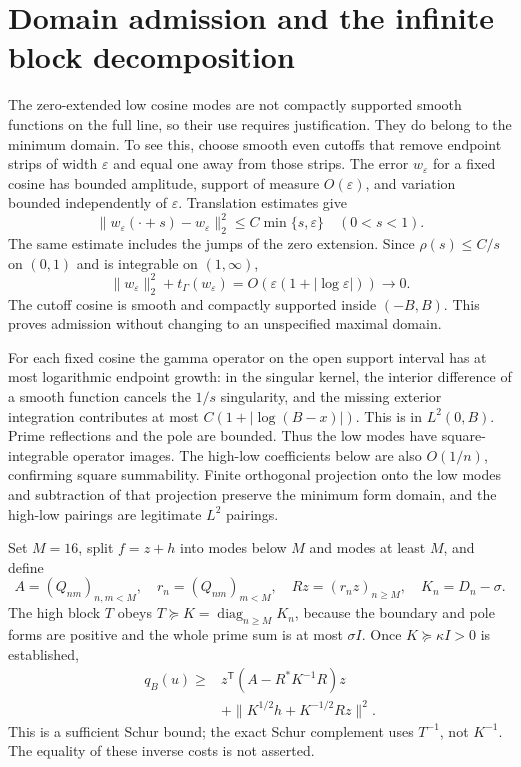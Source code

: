 \documentclass[11pt]{article}
\newcommand{\norm}[1]{\lVert#1\rVert}
\begin{document}
\section{Domain admission and the infinite block decomposition}
The zero-extended low cosine modes are not compactly supported smooth functions on the full line, so their use requires justification. They do belong to the minimum domain. To see this, choose smooth even cutoffs that remove endpoint strips of width $\varepsilon$ and equal one away from those strips. The error $w_\varepsilon$ for a fixed cosine has bounded amplitude, support of measure $O(\varepsilon)$, and variation bounded independently of $\varepsilon$. Translation estimates give
\[
 \norm{w_\varepsilon(\cdot+s)-w_\varepsilon}_2^2
 \le C\min\{s,\varepsilon\}\quad(0<s<1).
\]
The same estimate includes the jumps of the zero extension. Since $\rho(s)\le C/s$ on $(0,1)$ and is integrable on $(1,\infty)$,
\[
 \norm{w_\varepsilon}_2^2+t_\Gamma(w_\varepsilon)
 =O(\varepsilon(1+|\log\varepsilon|))\longrightarrow0.
\]
The cutoff cosine is smooth and compactly supported inside $(-B,B)$. This proves admission without changing to an unspecified maximal domain.

For each fixed cosine the gamma operator on the open support interval has at most logarithmic endpoint growth: in the singular kernel, the interior difference of a smooth function cancels the $1/s$ singularity, and the missing exterior integration contributes at most $C(1+|\log(B-x)|)$. This is in $L^2(0,B)$. Prime reflections and the pole are bounded. Thus the low modes have square-integrable operator images. The high-low coefficients below are also $O(1/n)$, confirming square summability. Finite orthogonal projection onto the low modes and subtraction of that projection preserve the minimum form domain, and the high-low pairings are legitimate $L^2$ pairings.

Set $M=16$, split $f=z+h$ into modes below $M$ and modes at least $M$, and define
\[
 A=(Q_{nm})_{n,m<M},\quad r_n=(Q_{nm})_{m<M},\quad
 Rz=(r_nz)_{n\ge M},\quad K_n=D_n-\sigma.
\]
The high block $T$ obeys $T\succeq K=\operatorname{diag}_{n\ge M}K_n$, because the boundary and pole forms are positive and the whole prime sum is at most $\sigma I$. Once $K\succeq\kappa I>0$ is established,
\begin{align}
 q_B(u)\ge{}&z^{\mathsf T}(A-R^*K^{-1}R)z\nonumber\\
 &+\norm{K^{1/2}h+K^{-1/2}Rz}^2.\label{eq:square}
\end{align}
This is a sufficient Schur bound; the exact Schur complement uses $T^{-1}$, not $K^{-1}$. The equality of these inverse costs is not asserted.
\end{document}
